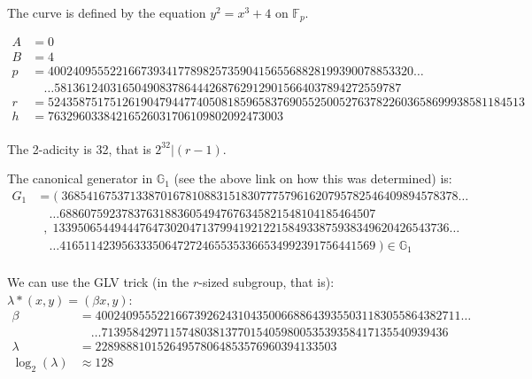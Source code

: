 \documentclass[12pt,draft,a4paper,openany,oneside]{amsbook}
\def\F{\mathbb{F}}
\def\G{\mathbb{G}}
\theoremstyle{plain}
\theoremstyle{definition}
\begin{document}
The curve is defined by the equation $y^2 = x^3 + 4$ on $\F_p$.

\begin{align*}
A &= 0 \\
B &= 4 \\
p &= 40024095552216673934177898257359041565568828199390078853320 \dots \\
  &\quad   \dots 58136124031650490837864442687629129015664037894272559787 \\ 
r &= 52435875175126190479447740508185965837690552500527637822603658699938581184513 \\
h &= 76329603384216526031706109802092473003 \\
\end{align*}

The 2-adicity is 32, that is $2^{32} | (r-1)$. 

The canonical generator in $\G_1$ (see the above link on how this was determined) is:
\begin{align*}
G_1 &= (\;3685416753713387016781088315183077757961620795782546409894578378\dots \\
    &   \quad\dots 688607592378376318836054947676345821548104185464507  \\ 
    &\;\;  ,\;1339506544944476473020471379941921221584933875938349620426543736\dots \\
    &   \quad\dots 416511423956333506472724655353366534992391756441569\;) \in \G_1\\
\end{align*}

We can use the GLV trick (in the $r$-sized subgroup, that is): $\lambda*(x,y)=(\beta x,y)$:
\begin{align*}
\beta &= 40024095552216673926243104350066886439355031183055864382711 \dots \\
      &\quad \dots 71395842971157480381377015405980053539358417135540939436\\
\lambda &= 228988810152649578064853576960394133503 \\
\log_2(\lambda) &\approx 128 \\
\end{align*}


\end{document}
